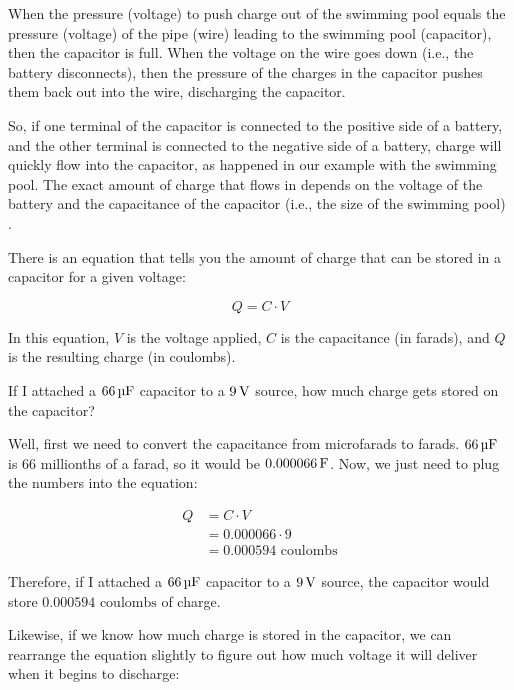 When the pressure (voltage) to push charge out of the swimming pool equals the pressure (voltage) of the pipe (wire) leading to the swimming pool (capacitor), then the capacitor is full.
When the voltage on the wire goes down (i.e., the battery disconnects), then the pressure of the charges in the capacitor pushes them back out into the wire, discharging the capacitor.


So, if one terminal of the capacitor is connected to the positive side of a battery, and the other terminal is connected to the negative side of a battery, charge will quickly flow into the capacitor, as happened in our example with the swimming pool.
The exact amount of charge that flows in depends on the voltage of the battery and the capacitance of the capacitor (i.e., the size of the swimming pool)
.

There is an equation that tells you the amount of charge that can be stored in a capacitor for a given voltage:

\begin{equation}
\label{eqBasicCapacitance}
Q = C\cdot V
\end{equation}

In this equation, $V$ is the voltage applied, $C$ is the capacitance (in farads), and $Q$ is the resulting charge (in coulombs).

\begin{exampleprob}
If I attached a $66\,\si{\micro\farad}$ capacitor to a $9\,\si{\volt}$ source, how much charge gets stored on the capacitor?

Well, first we need to convert the capacitance from microfarads to farads.  
$66\,\si{\micro\farad}$ is 66 millionths of a farad, so it would be $0.000066\,\si{\farad}$.
Now, we just need to plug the numbers into the equation:

\begin{align*}
Q &= C\cdot V \\
  &= 0.000066\cdot 9 \\
  &= 0.000594 \textrm{ coulombs}
\end{align*}

Therefore, if I attached a $66\,\si{\micro\farad}$ capacitor to a $9\,\si{\volt}$ source, the capacitor would store $0.000594 \textrm{ coulombs}$ of charge.
\end{exampleprob}

Likewise, if we know how much charge is stored in the capacitor, we can rearrange the equation slightly to figure out how much voltage it will deliver when it begins to discharge:

